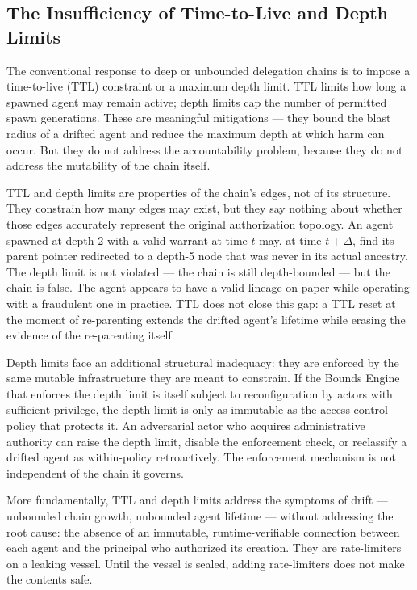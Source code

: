 \subsection{The Insufficiency of Time-to-Live and Depth Limits}
\label{sec:ttl-insufficiency}

The conventional response to deep or unbounded delegation chains is to impose a time-to-live (TTL) constraint or a maximum depth limit. TTL limits how long a spawned agent may remain active; depth limits cap the number of permitted spawn generations. These are meaningful mitigations — they bound the blast radius of a drifted agent and reduce the maximum depth at which harm can occur. But they do not address the accountability problem, because they do not address the mutability of the chain itself.

TTL and depth limits are properties of the chain's edges, not of its structure. They constrain how many edges may exist, but they say nothing about whether those edges accurately represent the original authorization topology. An agent spawned at depth 2 with a valid warrant at time $t$ may, at time $t+\Delta$, find its parent pointer redirected to a depth-5 node that was never in its actual ancestry. The depth limit is not violated — the chain is still depth-bounded — but the chain is false. The agent appears to have a valid lineage on paper while operating with a fraudulent one in practice. TTL does not close this gap: a TTL reset at the moment of re-parenting extends the drifted agent's lifetime while erasing the evidence of the re-parenting itself.

Depth limits face an additional structural inadequacy: they are enforced by the same mutable infrastructure they are meant to constrain. If the Bounds Engine that enforces the depth limit is itself subject to reconfiguration by actors with sufficient privilege, the depth limit is only as immutable as the access control policy that protects it. An adversarial actor who acquires administrative authority can raise the depth limit, disable the enforcement check, or reclassify a drifted agent as within-policy retroactively. The enforcement mechanism is not independent of the chain it governs.

More fundamentally, TTL and depth limits address the symptoms of drift — unbounded chain growth, unbounded agent lifetime — without addressing the root cause: the absence of an immutable, runtime-verifiable connection between each agent and the principal who authorized its creation. They are rate-limiters on a leaking vessel. Until the vessel is sealed, adding rate-limiters does not make the contents safe.

